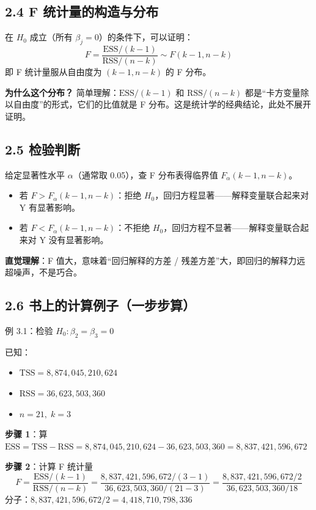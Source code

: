 \documentclass[12pt,a4paper]{ctexart}
\begin{document}
\subsection{2.4 F 统计量的构造与分布}

在 \(H_0\) 成立（所有 \(\beta_j = 0\)）的条件下，可以证明：
\begin{equation}
F = \frac{\text{ESS}/(k-1)}{\text{RSS}/(n-k)} \sim F(k-1, n-k) \tag{3.46}
\end{equation}
即 F 统计量服从自由度为 \((k-1, n-k)\) 的 F 分布。

\textbf{为什么这个分布？} 简单理解：\(\text{ESS}/(k-1)\) 和 \(\text{RSS}/(n-k)\) 都是“卡方变量除以自由度”的形式，它们的比值就是 F 分布。这是统计学的经典结论，此处不展开证明。

\subsection{2.5 检验判断}

给定显著性水平 \(\alpha\)（通常取 0.05），查 F 分布表得临界值 \(F_\alpha(k-1, n-k)\)。
\begin{itemize}
    \item 若 \(F > F_\alpha(k-1, n-k)\)：拒绝 \(H_0\)，回归方程显著——解释变量联合起来对 Y 有显著影响。
    \item 若 \(F < F_\alpha(k-1, n-k)\)：不拒绝 \(H_0\)，回归方程不显著——解释变量联合起来对 Y 没有显著影响。
\end{itemize}

\textbf{直觉理解}：F 值大，意味着“回归解释的方差 / 残差方差”大，即回归的解释力远超噪声，不是巧合。

\subsection{2.6 书上的计算例子（一步步算）}

例 3.1：检验 \(H_0: \beta_2 = \beta_3 = 0\)

已知：
\begin{itemize}
    \item \(\text{TSS} = 8,874,045,210,624\)
    \item \(\text{RSS} = 36,623,503,360\)
    \item \(n = 21,\; k = 3\)
\end{itemize}

\textbf{步骤 1}：算 \(\text{ESS} = \text{TSS} - \text{RSS} = 8,874,045,210,624 - 36,623,503,360 = 8,837,421,596,672\)

\textbf{步骤 2}：计算 F 统计量
\[
F = \frac{\text{ESS}/(k-1)}{\text{RSS}/(n-k)} = \frac{8,837,421,596,672 / (3-1)}{36,623,503,360 / (21-3)} = \frac{8,837,421,596,672 / 2}{36,623,503,360 / 18}
\]
分子：\(8,837,421,596,672 / 2 = 4,418,710,798,336\)
\end{document}
